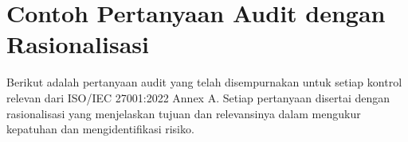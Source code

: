 \documentclass[12pt, a4paper]{report}
\begin{document}


\section{Contoh Pertanyaan Audit dengan Rasionalisasi}
Berikut adalah pertanyaan audit yang telah disempurnakan untuk setiap kontrol relevan dari ISO/IEC 27001:2022 Annex A. Setiap pertanyaan disertai dengan rasionalisasi yang menjelaskan tujuan dan relevansinya dalam mengukur kepatuhan dan mengidentifikasi risiko.
\end{document}
